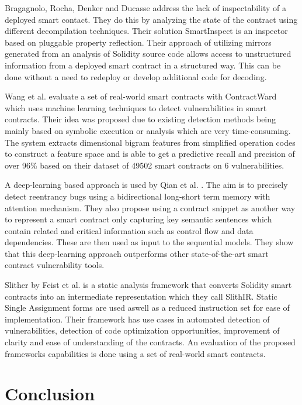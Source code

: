 \documentclass[10pt,conference]{IEEEtran}
\begin{document}
Bragagnolo, Rocha, Denker and Ducasse \cite{rocha} address the lack of inspectability of a deployed smart contact. They do this by analyzing the state of the contract using different decompilation techniques. Their solution SmartInspect is an inspector based on pluggable property reflection. Their approach of utilizing mirrors generated from an analysis of Solidity source code allows access to unstructured information from a deployed smart contract in a structured way. This can be done without a need to redeploy or develop additional code for decoding. 

Wang et al. \cite{contractward} evaluate a set of real-world smart contracts with ContractWard which uses machine learning techniques to detect vulnerabilities in smart contracts. Their idea was proposed due to existing detection methods being mainly based on symbolic execution or analysis which are very time-consuming. The system extracts dimensional bigram features from simplified operation codes to construct a feature space and is able to get a predictive recall and precision of over 96\% based on their dataset of 49502 smart contracts on 6 vulnerabilities.

A deep-learning based approach is used by Qian et al. \cite{automated}. The aim is to precisely detect reentrancy bugs using a bidirectional long-short term memory with attention mechanism. They also propose using a contract snippet as another way to represent a smart contract only capturing key semantic sentences which contain related and critical information such as control flow and data dependencies. These are then used as input to the sequential models. They show that this deep-learning approach outperforms other state-of-the-art smart contract vulnerability tools.

Slither by Feist et al. \cite{slither} is a static analysis framework that converts Solidity smart contracts into an intermediate representation which they call SlithIR. Static Single Assignment forms are used aswell as a reduced instruction set for ease of implementation. Their framework has use cases in automated detection of vulnerabilities, detection of code optimization opportunities, improvement of clarity and ease of understanding of the contracts. An evaluation of the proposed frameworks capabilities is done using a set of real-world smart contracts. 

\section{Conclusion}







\end{document}
